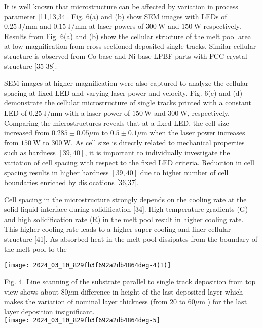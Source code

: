 \documentclass[10pt]{article}
\begin{document}
It is well known that microstructure can be affected by variation in process parameter [11,13,34]. Fig. 6(a) and (b) show SEM images with LEDs of $0.25 \mathrm{~J} / \mathrm{mm}$ and $0.15 \mathrm{~J} / \mathrm{mm}$ at laser powers of $300 \mathrm{~W}$ and $150 \mathrm{~W}$ respectively. Results from Fig. 6(a) and (b) show the cellular structure of the melt pool area at low magnification from cross-sectioned deposited single tracks. Similar cellular structure is observed from Co-base and Ni-base LPBF parts with FCC crystal structure [35-38].

SEM images at higher magnification were also captured to analyze the cellular spacing at fixed LED and varying laser power and velocity. Fig. 6(c) and (d) demonstrate the cellular microstructure of single tracks printed with a constant LED of $0.25 \mathrm{~J} / \mathrm{mm}$ with a laser power of $150 \mathrm{~W}$ and $300 \mathrm{~W}$, respectively. Comparing the microstructures reveals that at a fixed LED, the cell size increased from $0.285 \pm 0.05 \mu \mathrm{m}$ to $0.5 \pm 0.1 \mu \mathrm{m}$ when the laser power increases from $150 \mathrm{~W}$ to $300 \mathrm{~W}$. As cell size is directly related to mechanical properties such as hardness $[39,40]$, it is important to individually investigate the variation of cell spacing with respect to the fixed LED criteria. Reduction in cell spacing results in higher hardness $[39,40]$ due to higher number of cell boundaries enriched by dislocations [36,37].

Cell spacing in the microstructure strongly depends on the cooling rate at the solid-liquid interface during solidification [34]. High temperature gradients (G) and high solidification rate (R) in the melt pool result in higher cooling rate. This higher cooling rate leads to a higher super-cooling and finer cellular structure [41]. As absorbed heat in the melt pool dissipates from the boundary of the melt pool to the

\begin{center}
\texttt{[image: 2024\_03\_10\_829fb3f692a2db4864deg-4(1)]}
\end{center}

Fig. 4. Line scanning of the substrate parallel to single track deposition from top view shows about $80 \mu \mathrm{m}$ difference in height of the last deposited layer which makes the variation of nominal layer thickness (from 20 to $60 \mu \mathrm{m}$ ) for the last layer deposition insignificant.\\
\texttt{[image: 2024\_03\_10\_829fb3f692a2db4864deg-5]}
\end{document}
